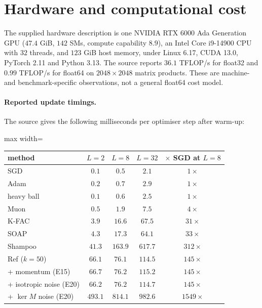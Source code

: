 \documentclass{article}
\theoremstyle{definition}
\theoremstyle{remark}
\begin{document}
\section{Hardware and computational cost}\label{app:cost}

The supplied hardware description is one NVIDIA RTX 6000 Ada Generation GPU ($47.4$ GiB, $142$ SMs, compute capability $8.9$), an Intel Core i9-14900 CPU with $32$ threads, and $123$ GiB host memory, under Linux 6.17, CUDA 13.0, PyTorch 2.11 and Python 3.13. The source reports $36.1$ TFLOP/s for float32 and $0.99$ TFLOP/s for float64 on $2048\times2048$ matrix products. These are machine- and benchmark-specific observations, not a general float64 cost model.

\paragraph{Reported update timings.}
The source gives the following milliseconds per optimiser step after warm-up:

\begin{center}\small
\begin{adjustbox}{max width=\linewidth}
\begin{tabular}{lcccc}
\toprule
method & $L=2$ & $L=8$ & $L=32$ & $\times$ SGD at $L=8$ \\
\midrule
SGD      & $0.1$  & $0.5$   & $2.1$   & $1\times$ \\
Adam                  & $0.2$  & $0.7$   & $2.9$   & $1\times$ \\
heavy ball            & $0.1$  & $0.6$   & $2.5$   & $1\times$ \\
Muon                  & $0.5$  & $1.9$   & $7.5$   & $4\times$ \\
K-FAC                 & $3.9$  & $16.6$  & $67.5$  & $31\times$ \\
SOAP                  & $4.3$  & $17.3$  & $64.1$  & $33\times$ \\
Shampoo               & $41.3$ & $163.9$ & $617.7$ & $312\times$ \\
\midrule
Ref ($k=50$)    & $66.1$ & $76.1$  & $114.5$ & $145\times$ \\
\; + momentum (E15)   & $66.7$ & $76.2$  & $115.2$ & $145\times$ \\
\; + isotropic noise (E20) & $66.2$ & $76.2$ & $114.7$ & $145\times$ \\
\; + $\ker M$ noise (E20)  & $493.1$ & $814.1$ & $982.6$ & $1549\times$ \\
\bottomrule
\end{tabular}
\end{adjustbox}
\end{center}
\end{document}
